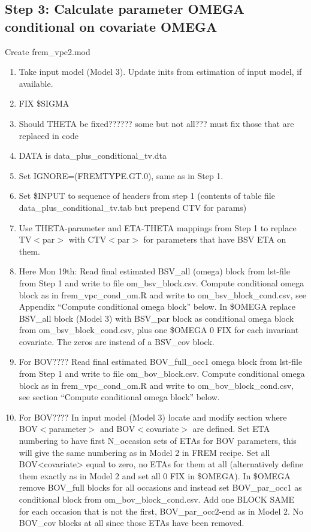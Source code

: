\documentclass[a4paper,12pt]{article}
\begin{document}
\subsection{Step 3:  Calculate parameter OMEGA conditional on covariate OMEGA}
Create frem\_vpc2.mod
\begin{enumerate}
	\item Take input model (Model 3). Update inits from estimation of input model, if available. 
	\item FIX \$SIGMA
	\item Should THETA be fixed?????? some but not all??? must fix those that are replaced in code
	\item DATA is data\_plus\_conditional\_tv.dta
	\item Set IGNORE=(FREMTYPE.GT.0), same as in Step 1.
	\item Set \$INPUT to sequence of headers from step 1 (contents of table file data\_plus\_conditional\_tv.tab but prepend CTV for params)
	\item Use THETA-parameter and ETA-THETA mappings from Step 1 to replace TV$<$par$>$ with CTV$<$par$>$ for parameters that have BSV ETA on them.
	\item Here Mon 19th: Read final estimated BSV\_all (omega) block from lst-file from Step 1 and write to file om\_bsv\_block.csv. Compute conditional omega block as in frem\_vpc\_cond\_om.R and write to om\_bsv\_block\_cond.csv, see Appendix “Compute conditional omega block” below. In \$OMEGA replace BSV\_all block (Model 3) with BSV\_par block as conditional omega block from om\_bsv\_block\_cond.csv, plus one \$OMEGA 0 FIX for each invariant covariate. The zeros are instead of a BSV\_cov block.
	\item For BOV???? Read final estimated BOV\_full\_occ1 omega block from lst-file from Step 1 and write to file om\_bov\_block.csv. Compute conditional omega block as in frem\_vpc\_cond\_om.R and write to om\_bov\_block\_cond.csv, see section “Compute conditional omega block” below.  
	\item For BOV???? In input model (Model 3) locate and modify section where BOV$<$parameter$>$ and BOV$<$covariate$>$ are defined. Set ETA numbering to have first N\_occasion sets of ETAs for BOV parameters, this will give the same numbering as in Model 2 in FREM recipe. Set all BOV<covariate> equal to zero, no ETAs for them at all (alternatively define them exactly as in Model 2 and set all 0 FIX in \$OMEGA). In \$OMEGA remove BOV\_full blocks for all occasions and instead set BOV\_par\_occ1 as conditional block from om\_bov\_block\_cond.csv. Add one BLOCK SAME for each occasion that is not the first, BOV\_par\_occ2-end as in Model 2. No BOV\_cov blocks at all since those ETAs have been removed. 
\end{enumerate}
\end{document}
